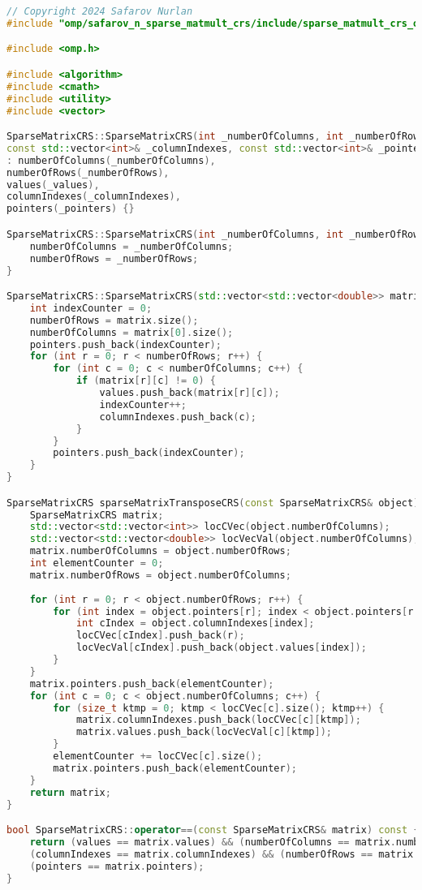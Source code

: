 \documentclass[a4paper, 14pt]{article}
\theoremstyle{plain}
\begin{document}
\begin{lstlisting}[language=C++,caption=Файл sparse\_matmult\_crs\_omp.cpp]
// Copyright 2024 Safarov Nurlan
#include "omp/safarov_n_sparse_matmult_crs/include/sparse_matmult_crs_omp.hpp"

#include <omp.h>

#include <algorithm>
#include <cmath>
#include <utility>
#include <vector>

SparseMatrixCRS::SparseMatrixCRS(int _numberOfColumns, int _numberOfRows, const std::vector<double>& _values,
const std::vector<int>& _columnIndexes, const std::vector<int>& _pointers)
: numberOfColumns(_numberOfColumns),
numberOfRows(_numberOfRows),
values(_values),
columnIndexes(_columnIndexes),
pointers(_pointers) {}

SparseMatrixCRS::SparseMatrixCRS(int _numberOfColumns, int _numberOfRows) {
	numberOfColumns = _numberOfColumns;
	numberOfRows = _numberOfRows;
}

SparseMatrixCRS::SparseMatrixCRS(std::vector<std::vector<double>> matrix) {
	int indexCounter = 0;
	numberOfRows = matrix.size();
	numberOfColumns = matrix[0].size();
	pointers.push_back(indexCounter);
	for (int r = 0; r < numberOfRows; r++) {
		for (int c = 0; c < numberOfColumns; c++) {
			if (matrix[r][c] != 0) {
				values.push_back(matrix[r][c]);
				indexCounter++;
				columnIndexes.push_back(c);
			}
		}
		pointers.push_back(indexCounter);
	}
}

SparseMatrixCRS sparseMatrixTransposeCRS(const SparseMatrixCRS& object) {
	SparseMatrixCRS matrix;
	std::vector<std::vector<int>> locCVec(object.numberOfColumns);
	std::vector<std::vector<double>> locVecVal(object.numberOfColumns);
	matrix.numberOfColumns = object.numberOfRows;
	int elementCounter = 0;
	matrix.numberOfRows = object.numberOfColumns;
	
	for (int r = 0; r < object.numberOfRows; r++) {
		for (int index = object.pointers[r]; index < object.pointers[r + 1]; index++) {
			int cIndex = object.columnIndexes[index];
			locCVec[cIndex].push_back(r);
			locVecVal[cIndex].push_back(object.values[index]);
		}
	}
	matrix.pointers.push_back(elementCounter);
	for (int c = 0; c < object.numberOfColumns; c++) {
		for (size_t ktmp = 0; ktmp < locCVec[c].size(); ktmp++) {
			matrix.columnIndexes.push_back(locCVec[c][ktmp]);
			matrix.values.push_back(locVecVal[c][ktmp]);
		}
		elementCounter += locCVec[c].size();
		matrix.pointers.push_back(elementCounter);
	}
	return matrix;
}

bool SparseMatrixCRS::operator==(const SparseMatrixCRS& matrix) const {
	return (values == matrix.values) && (numberOfColumns == matrix.numberOfColumns) &&
	(columnIndexes == matrix.columnIndexes) && (numberOfRows == matrix.numberOfRows) &&
	(pointers == matrix.pointers);
}


\end{lstlisting}
\end{document}
